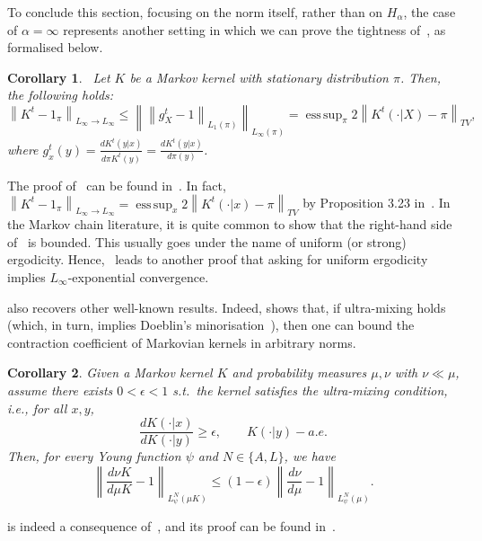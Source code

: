 \documentclass[11pt]{article}
\DeclareMathOperator*{\esssup}{ess\,sup}
\theoremstyle{plain}
\newtheorem{corollary}{Corollary}[section]
\theoremstyle{remark}
\begin{document}
To conclude this section, focusing on the norm itself, rather than on $H_\alpha$, the case of $\alpha=\infty$ represents another %
     setting in which we can prove the tightness of~, as formalised below.
         \begin{corollary}~\label{thm:alphaInfinityCase}
    Let $K$ be a Markov kernel with stationary distribution $\pi$. Then, the following holds:
  \begin{equation}
        \left\lVert K^t-1_\pi \right\rVert_{L_\infty \to L_\infty} \leq \left\lVert \left\lVert g^t_X -1  \right\rVert_{L_1(\pi)} \right\rVert_{L_\infty(\pi)} = \esssup_{\pi} 2\left\lVert K^t(\cdot|X)-\pi \right\rVert_{TV},~\label{eq:alphaInfinityCase}
    \end{equation}
    where $g_x^t(y)=\frac{dK^t(y|x)}{d\pi K^t(y)} = \frac{dK^t(y|x)}{d\pi(y)}$.
\end{corollary}
The proof of~ can be found in~.
In fact, $\left\lVert K^t-1_\pi \right\rVert_{L_\infty \to L_\infty}=\esssup_{x} 2\left\lVert K^t(\cdot|x)-\pi \right\rVert_{TV}$ by Proposition 3.23 in~\cite{mcmcThesis}. 
In the Markov chain literature, it is quite common to show that %
the right-hand side of~ is bounded. This usually goes under the name of uniform (or strong) ergodicity. Hence,~ leads to another proof that asking for uniform ergodicity implies $L_\infty$-exponential convergence. 

 also %
recovers %
other well-known results. %
Indeed, \cite{contractionLedoux} shows that, if ultra-mixing holds (which, in turn, implies Doeblin's minorisation~\cite[Section 4.3.3]{hiddenMarkovModels}), then one can bound the contraction coefficient of Markovian kernels in arbitrary norms. %
\begin{corollary}\label{thm:ultraMixing}
        Given a Markov kernel $K$ and probability measures $\mu,\nu$ with $\nu\ll\mu$, assume there exists $0<\epsilon<1$ s.t.\ the kernel satisfies the ultra-mixing condition,  \textit{i.e.}, for all $x,y$,
    \begin{equation}
        \frac{dK(\cdot|x)}{dK(\cdot|y)}\geq \epsilon,  \hspace{2em} K(\cdot|y)-a.e. \label{eq:ultraMixing}
    \end{equation}
    Then, for every Young function $\psi$ and $N\in\{A,L\}$, we have
     \begin{equation}
        \left\lVert \frac{d\nu K}{d\mu K} -1\right\rVert_{L^N_\psi(\mu K)} \leq (1-\epsilon) \left\lVert \frac{d\nu}{d\mu } -1 \right\rVert_{L^N_\psi(\mu)}.
    \end{equation}
    \end{corollary}
 is indeed a consequence of~, and
its proof %
can be found in~.
\end{document}
